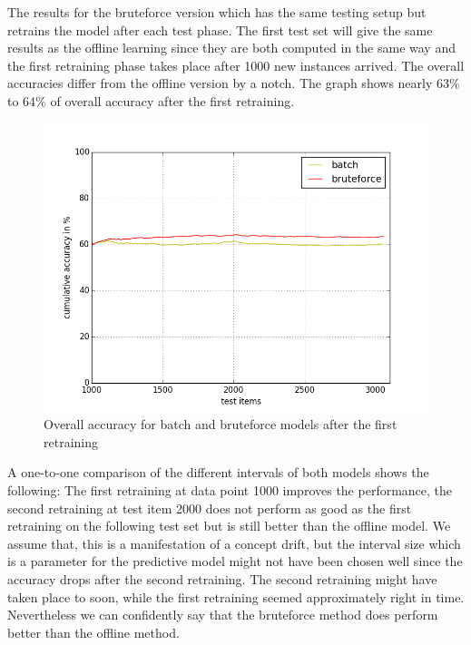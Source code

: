 \documentclass{article} %
\begin{document}
The results for the bruteforce version which has the same testing setup but retrains the model after each test phase. The first test set will give the same results as the offline learning since they are both computed in the same way and the first retraining phase takes place after 1000 new instances arrived. The overall accuracies differ from the offline version by a notch. The graph shows nearly 63\% to 64\% of overall accuracy after the first retraining.

\begin{figure}[htbp]
  \centering
  \includegraphics[scale=0.5]{./plots/overallBatchBruteforce.png}
  \caption{Overall accuracy for batch and bruteforce models after the first retraining}
\end{figure}
A one-to-one comparison of the different intervals of both models shows the following: The first retraining at data point 1000 improves the performance, the second retraining at test item 2000 does not perform as good as the first retraining on the following test set but is still better than the offline model. We assume that, this is a manifestation of a concept drift, but the interval size which is a parameter for the predictive model might not have been chosen well since the accuracy drops after the second retraining. The second retraining might have taken place to soon, while the first retraining seemed approximately right in time. Nevertheless we can confidently say that the bruteforce method does perform better than the offline method.
\end{document}
